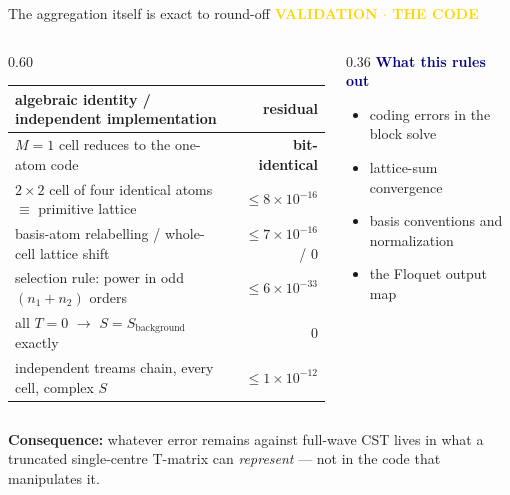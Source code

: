 \documentclass[10pt,aspectratio=169]{beamer}
\newcommand{\kicker}[1]{{\footnotesize\bfseries\textcolor{gold}{#1}}\\[-0.4ex]}
\begin{document}
\begin{frame}{The aggregation itself is exact to round-off}
  \kicker{VALIDATION  $\cdot$  THE CODE}
  \begin{columns}[t]
    \begin{column}{0.60\textwidth}
      \small
      \begin{tabular}{@{}lr@{}}
        \toprule
        algebraic identity / independent implementation & residual \\
        \midrule
        $M=1$ cell reduces to the one-atom code & \textcolor{good}{\textbf{bit-identical}} \\
        $2\times2$ cell of four identical atoms $\equiv$ primitive lattice & \textcolor{good}{$\le 8\times10^{-16}$} \\
        basis-atom relabelling / whole-cell lattice shift & \textcolor{good}{$\le 7\times10^{-16}$ / $0$} \\
        selection rule: power in odd $(n_1{+}n_2)$ orders & \textcolor{good}{$\le 6\times10^{-33}$} \\
        all $T=0$ $\rightarrow$ $S = S_{\text{background}}$ exactly & \textcolor{good}{$0$} \\
        independent treams chain, every cell, complex $S$ & \textcolor{good}{$\le 1\times10^{-12}$} \\
        \bottomrule
      \end{tabular}
    \end{column}
    \begin{column}{0.36\textwidth}
      \textcolor{navy}{\textbf{What this rules out}}
      \begin{itemize}\small
        \item coding errors in the block solve
        \item lattice-sum convergence
        \item basis conventions and normalization
        \item the Floquet output map
      \end{itemize}
    \end{column}
  \end{columns}
  \vspace{2ex}
  \colorbox{cardgold}{\parbox{0.96\textwidth}{\small\textbf{\textcolor{golddk}{Consequence:}}
  whatever error remains against full-wave CST lives in what a truncated single-centre T-matrix can
  \emph{represent} --- not in the code that manipulates it.}}
\end{frame}
\end{document}
